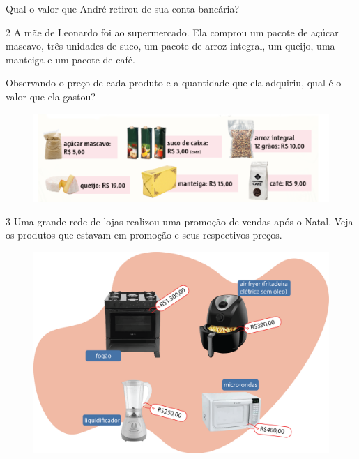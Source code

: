 Qual o valor que André retirou de sua conta bancária?

\pagebreak
\num{2} A mãe de Leonardo foi ao supermercado. Ela comprou um pacote de açúcar mascavo, três unidades de suco, um pacote de arroz integral, um queijo, uma manteiga e um pacote de café.

Observando o preço de cada produto e a quantidade que ela adquiriu, qual é o valor que ela gastou? 

\begin{figure}[htpb!]
\centering
\includegraphics[width=\textwidth]{./media/image66.png}
\end{figure}


\num{3} Uma grande rede de lojas realizou uma promoção de vendas após o Natal.
Veja os produtos que estavam em promoção e seus respectivos preços.

\begin{figure}[htpb!]
\centering
\includegraphics[width=.73\textwidth]{./media/image67.png}
\end{figure}

\pagebreak

